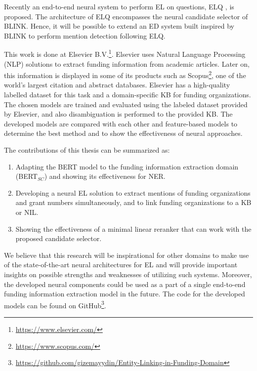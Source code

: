 \documentclass{report}
\theoremstyle{definition}
\theoremstyle{remark}
\begin{document}
Recently an end-to-end neural system to perform EL on questions, ELQ \cite{elq}, is proposed. The architecture of ELQ encompasses the neural candidate selector of BLINK. Hence, it will be possible to extend an ED system built inspired by BLINK to perform mention detection following ELQ. 

This work is done at Elsevier B.V.\footnote{\url{https://www.elsevier.com/}}. Elsevier uses Natural Language Processing (NLP) solutions to extract funding information from academic articles. Later on, this information is displayed in some of its products such as Scopus\footnote{\url{https://www.scopus.com/}}, one of the world's largest citation and abstract databases. Elsevier has a high-quality labelled dataset for this task and a domain-specific KB for funding organizations. The chosen models are trained and evaluated using the labeled dataset provided by Elsevier, and also disambiguation is performed to the provided KB. The developed models are compared with each other and feature-based models to determine the best method and to show the effectiveness of neural approaches.

The contributions of this thesis can be summarized as:
\renewcommand{\labelenumi}{\arabic{enumi}.} 
\begin{enumerate}
    \item Adapting the BERT model to the funding information extraction domain (BERT$_{SC}$) and showing its effectiveness for NER.
    \item Developing a neural EL solution to extract mentions of funding organizations and grant numbers simultaneously, and to link funding organizations to a KB or NIL.
    \item Showing the effectiveness of a minimal linear reranker that can work with the proposed candidate selector.
\end{enumerate}

We believe that this research will be inspirational for other domains to make use of the state-of-the-art neural architectures for EL and will provide important insights on possible strengths and weaknesses of utilizing such systems. Moreover, the developed neural components could be used as a part of a single end-to-end funding information extraction model in the future. The code for the developed models can be found on GitHub\footnote{\url{https://github.com/gizemayydin/Entity-Linking-in-Funding-Domain}}.
\end{document}
